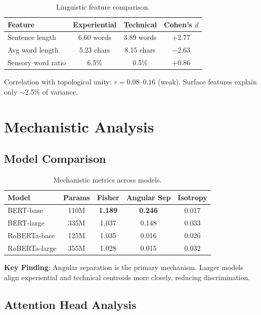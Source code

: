 \documentclass[11pt,a4paper]{article}
\newcommand{\dval}{\textit{d}}
\begin{document}
\begin{table}[H]
\centering
\begin{tabular}{lccc}
\toprule
\textbf{Feature} & \textbf{Experiential} & \textbf{Technical} & \textbf{Cohen's $\dval$} \\
\midrule
Sentence length & 6.60 words & 3.89 words & +2.77 \\
Avg word length & 5.23 chars & 8.15 chars & $-$2.63 \\
Sensory word ratio & 6.5\% & 0.5\% & +0.86 \\
\bottomrule
\end{tabular}
\caption{Linguistic feature comparison.}
\label{tab:linguistic}
\end{table}

Correlation with topological unity: $r = 0.08$--$0.16$ (weak). Surface features explain only $\sim$2.5\% of variance.

\section{Mechanistic Analysis}

\subsection{Model Comparison}

\begin{table}[H]
\centering
\begin{tabular}{lcccc}
\toprule
\textbf{Model} & \textbf{Params} & \textbf{Fisher} & \textbf{Angular Sep} & \textbf{Isotropy} \\
\midrule
BERT-base & 110M & \textbf{1.189} & \textbf{0.246} & 0.017 \\
BERT-large & 335M & 1.037 & 0.148 & 0.033 \\
RoBERTa-base & 125M & 1.035 & 0.016 & 0.026 \\
RoBERTa-large & 355M & 1.028 & 0.015 & 0.032 \\
\bottomrule
\end{tabular}
\caption{Mechanistic metrics across models.}
\label{tab:mechanistic}
\end{table}

\textbf{Key Finding}: Angular separation is the primary mechanism. Larger models align experiential and technical centroids more closely, reducing discrimination.

\subsection{Attention Head Analysis}
\end{document}

